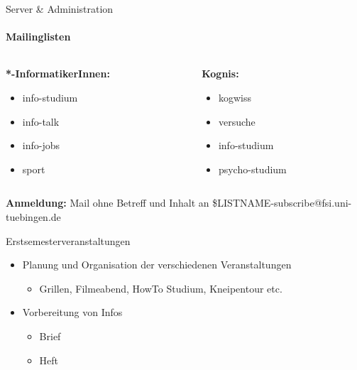 \documentclass{beamer}
\begin{document}
	\begin{frame}{Server \& Administration}
	\framesubtitle{Mailinglisten}
		\begin{columns}
			\begin{column}{.5\textwidth}
				\textbf{*-InformatikerInnen:}
				\small
				\begin{itemize}
					\item info-studium 
					\item info-talk
					\item info-jobs
					\item sport
				\end{itemize}
			\end{column}
			\begin{column}{.5\textwidth}
				\textbf{Kognis:}\\
				\small
				\begin{itemize}
					\item kogwiss 
					\item versuche
					\item info-studium
					\item psycho-studium
				\end{itemize}

			\end{column}
		\end{columns}
		\vfill
		\textbf{Anmeldung:} Mail ohne Betreff und Inhalt an \$LISTNAME-subscribe@fsi.uni-tuebingen.de
	
	\end{frame}
	
	\begin{frame}{Erstsemesterveranstaltungen}
		\begin{itemize}
			\item Planung und Organisation der verschiedenen Veranstaltungen
			\begin{itemize}
				\item Grillen, Filmeabend, HowTo Studium, Kneipentour etc.
			\end{itemize}
			\item Vorbereitung von Infos
			\begin{itemize}
				\item Brief
				\item Heft
			\end{itemize}
		\end{itemize}
	\end{frame}
	
\end{document}

